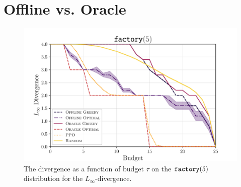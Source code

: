 \section{Offline vs. Oracle}
\label{sec:linf}

\begin{figure}[t!]
  \centering
	\includegraphics[width=\stdfigwidth]{figures/linf_norm_predictible_factory5.pdf}
	\caption{ The divergence as a function of budget $ \tau $ on the $ \factory[5] $ distribution for the $ L_\infty $-divergence. }
	\label{fig:offlinebeatsoracle}
\end{figure}

